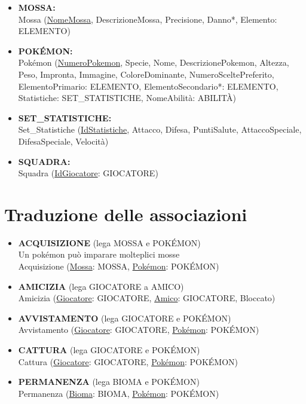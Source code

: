\documentclass[a4paper,12pt]{report}
\begin{document}
\begin{itemize}
\item \textbf{MOSSA:} \\
Mossa (\underline{NomeMossa}, DescrizioneMossa, Precisione, Danno*, Elemento: ELEMENTO)

\item \textbf{POKÉMON:} \\
Pokémon (\underline{NumeroPokemon}, Specie, Nome, DescrizionePokemon, Altezza, Peso, Impronta, Immagine, ColoreDominante, NumeroSceltePreferito, ElementoPrimario: ELEMENTO, ElementoSecondario*: ELEMENTO, Statistiche: SET\_STATISTICHE, NomeAbilità: ABILITÀ)

\item \textbf{SET\_STATISTICHE:} \\
Set\_Statistiche (\underline{IdStatistiche}, Attacco, Difesa, PuntiSalute, AttaccoSpeciale, DifesaSpeciale, Velocità)

\item \textbf{SQUADRA:} \\
Squadra (\underline{IdGiocatore}: GIOCATORE)
\end{itemize}

\section{Traduzione delle associazioni}

\begin{itemize}
\item \textbf{ACQUISIZIONE} (lega MOSSA e POKÉMON) \\
Un pokémon può imparare molteplici mosse \\
Acquisizione (\underline{Mossa}: MOSSA, \underline{Pokémon}: POKÉMON)

\item \textbf{AMICIZIA} (lega GIOCATORE a AMICO) \\
Amicizia (\underline{Giocatore}: GIOCATORE, \underline{Amico}: GIOCATORE, Bloccato)

\item \textbf{AVVISTAMENTO} (lega GIOCATORE e POKÉMON) \\
Avvistamento (\underline{Giocatore}: GIOCATORE, \underline{Pokémon}: POKÉMON)

\item \textbf{CATTURA} (lega GIOCATORE e POKÉMON) \\
Cattura (\underline{Giocatore}: GIOCATORE, \underline{Pokémon}: POKÉMON)

\item \textbf{PERMANENZA} (lega BIOMA e POKÉMON) \\
Permanenza (\underline{Bioma}: BIOMA, \underline{Pokémon}: POKÉMON)
\end{itemize}
\end{document}
